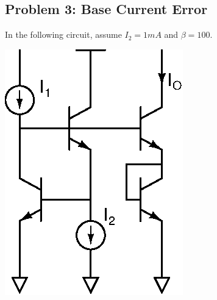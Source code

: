 \documentclass[11pt,twoside]{article}
\begin{document}
\subsection*{Problem 3: Base Current Error}
In the following circuit, assume $I_2=1mA$ and $\beta=100$.\\
\vspace{1ex}

\begin{center}
\includegraphics[width=.28\textwidth]{sqrtxy.eps}
\end{center}
\clearpage
\end{document}
